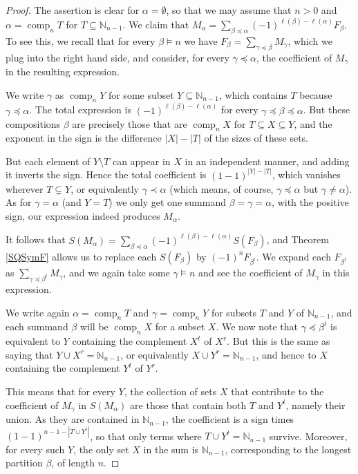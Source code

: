 \documentclass{article}
\theoremstyle{definition}
\begin{document}
\begin{proof}
The assertion is clear for $\alpha=\emptyset$, so that we may assume that $n>0$ and $\alpha=\operatorname{comp}_{n}T$ for $T\subseteq\mathbb{N}_{n-1}$. We claim that $M_{\alpha}=\sum_{\beta\preceq\alpha}(-1)^{\ell(\beta)-\ell(\alpha)}F_{\beta}$. To see this, we recall that for every $\beta \vDash n$ we have $F_{\beta}=\sum_{\gamma\preceq\beta}M_{\gamma}$, which we plug into the right hand side, and consider, for every $\gamma\preceq\alpha$, the coefficient of $M_{\gamma}$ in the resulting expression.

We write $\gamma$ as $\operatorname{comp}_{n}Y$ for some subset $Y\subseteq\mathbb{N}_{n-1}$, which contains $T$ because $\gamma\preceq\alpha$. The total expression is $(-1)^{\ell(\beta)-\ell(\alpha)}$ for every $\gamma\preceq\beta\preceq\alpha$. But these compositions $\beta$ are precisely those that are $\operatorname{comp}_{n}X$ for $T \subseteq X \subseteq Y$, and the exponent in the sign is the difference $|X|-|T|$ of the sizes of these sets.

But each element of $Y \setminus T$ can appear in $X$ in an independent manner, and adding it inverts the sign. Hence the total coefficient is $(1-1)^{|Y|-|T|}$, which vanishes wherever $T \subsetneq Y$, or equivalently $\gamma\prec\alpha$ (which means, of course, $\gamma\preceq\alpha$ but $\gamma\neq\alpha$). As for $\gamma=\alpha$ (and $Y=T$) we only get one summand $\beta=\gamma=\alpha$, with the positive sign, our expression indeed produces $M_{\alpha}$.

It follows that $S(M_{\alpha})=\sum_{\beta\preceq\alpha}(-1)^{\ell(\beta)-\ell(\alpha)}S(F_{\beta})$, and Theorem \ref{SQSymF} allows us to replace each $S(F_{\beta})$ by $(-1)^{n}F_{\beta^{t}}$. We expand each $F_{\beta^{t}}$ as $\sum_{\gamma\preceq\beta^{t}}M_{\gamma}$, and we again take some $\gamma \vDash n$ and see the coefficient of $M_{\gamma}$ in this expression.

We write again $\alpha=\operatorname{comp}_{n}T$ and $\gamma=\operatorname{comp}_{n}Y$ for subsets $T$ and $Y$ of $\mathbb{N}_{n-1}$, and each summand $\beta$ will be $\operatorname{comp}_{n}X$ for a subset $X$. We now note that $\gamma\preceq\beta^{t}$ is equivalent to $Y$ containing the complement $X^{t}$ of $X^{r}$. But this is the same as saying that $Y \cup X^{r}=\mathbb{N}_{n-1}$, or equivalently $X \cup Y^{r}=\mathbb{N}_{n-1}$, and hence to $X$ containing the complement $Y^{t}$ of $Y^{r}$.

This means that for every $Y$, the collection of sets $X$ that contribute to the coefficient of $M_{\gamma}$ in $S(M_{\alpha})$ are those that contain both $T$ and $Y^{t}$, namely their union. As they are contained in $\mathbb{N}_{n-1}$, the coefficient is a sign times $(1-1)^{n-1-|T \cup Y^{t}|}$, so that only terms where $T \cup Y^{t}=\mathbb{N}_{n-1}$ survive. Moreover, for every such $Y$, the only set $X$ in the sum is $\mathbb{N}_{n-1}$, corresponding to the longest partition $\beta$, of length $n$.


\end{proof}
\end{document}
